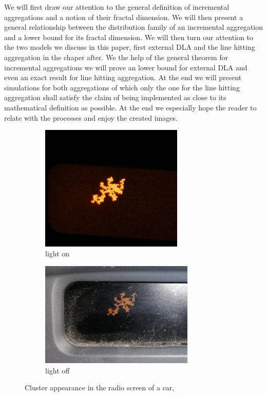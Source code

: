 \documentclass[12pt,a4paper]{scrartcl}
\newcommand{\1}{\mathbbm{1}}
\theoremstyle{definition}
\numberwithin{equation}{section}
\begin{document}
	\noindent We will first draw our attention to the general definition of incremental aggregations and a notion of their fractal dimension. We will then present a general relationship between the distribution family of an incremental aggregation and a lower bound for its fractal dimension. We will then turn our attention to the two models we discuss in this paper, first external DLA and the line hitting aggregation in the chaper after. We the help of the general theorem for incremental aggregations we will prove an lower bound for external DLA and even an exact result for line hitting aggregation. At the end we will present simulations for both aggregations of which only the one for the line hitting aggregation shall satisfy the claim of being implemented as close to its mathematical definition as possible. At the end we especially hope the reader to relate with the processes and enjoy the created images.
	
\begin{figure}[p]
	\centering
	\begin{subfigure}[b]{.47\textwidth}
		\includegraphics[height=6cm]{images/display.jpg} 
		\caption{light on} 
	\end{subfigure}
	\begin{subfigure}[b]{.47\textwidth}
		\includegraphics[height=5cm]{images/display2.jpg}
		\caption{light off} 
	\end{subfigure}
	\caption{Cluster appearance in the radio screen of a car, \cite{own}}
	\label{radio}
\end{figure}
\end{document}
